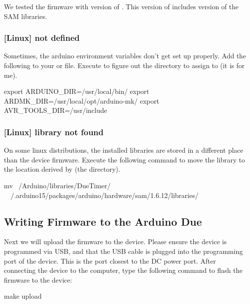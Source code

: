 We tested the firmware with version  of . This version
of  includes version  of the SAM libraries.

\subsubsection{[Linux]  not defined}

Sometimes, the arduino environment variables don't get set up properly. Add the
following to your  or  file. Execute  to figure out the directory to assign  to (it is  for me).

\begin{snippet}
export ARDUINO_DIR=/usr/local/bin/
export ARDMK_DIR=/usr/local/opt/arduino-mk/
export AVR_TOOLS_DIR=/usr/include
\end{snippet}

\subsubsection{[Linux]  library not found}

On some linux distributions, the installed libraries are stored in a different
place than the device firmware. Execute the following command to move the
 library to the location derived by  (the
 directory).

\begin{snippet}
  mv ~/Arduino/libraries/DueTimer/ \
      ~/.arduino15/packages/arduino/hardware/sam/1.6.12/libraries/
\end{snippet}

\subsection{Writing Firmware to the Arduino Due}

Next we will upload the firmware to the
device. Please ensure the device is programmed via USB,
and that the USB cable is plugged into the programming port of the device.
This is the port closest to the DC power port. After connecting the device to
the computer, type the following command to flash the firmware to the device:

\begin{snippet}
  make upload
\end{snippet}

